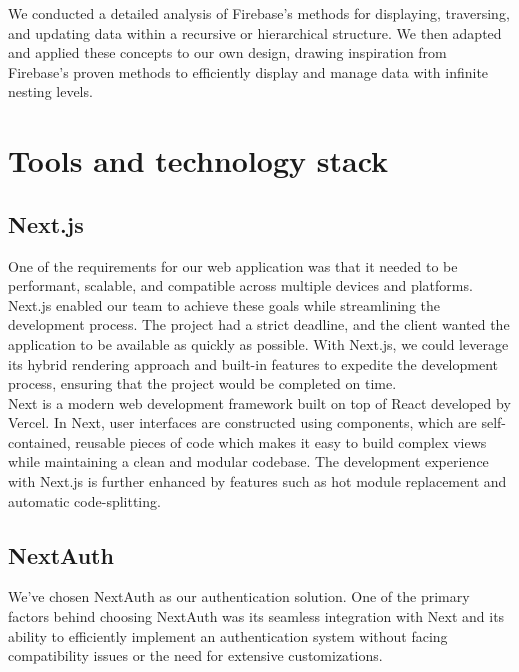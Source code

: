 \noindent 
We conducted a detailed analysis of Firebase’s methods for displaying, traversing, and updating data within a recursive or hierarchical structure. We then adapted and applied these concepts to our own design, drawing inspiration from Firebase's proven methods to efficiently display and manage data with infinite nesting levels. 



\section{Tools and technology stack}

\subsection{Next.js}

One of the requirements for our web application was that it needed to be performant, scalable, and compatible across multiple devices and platforms. Next.js enabled our team to achieve these goals while streamlining the development process. The project had a strict deadline, and the client wanted the application to be available as quickly as possible. With Next.js, we could leverage its hybrid rendering approach and built-in features to expedite the development process, ensuring that the project would be completed on time. \\

\noindent
Next is a modern web development framework built on top of React developed by Vercel. In Next, user interfaces are constructed using components, which are self-contained, reusable pieces of code which makes it easy to build complex views while maintaining a clean and modular codebase. The development experience with Next.js is further enhanced by features such as hot module replacement and automatic code-splitting. \cite{NextjsDocs}

\subsection{NextAuth}

We’ve chosen NextAuth as our authentication solution. One of the primary factors behind choosing NextAuth was its seamless integration with Next and its ability to  efficiently implement an authentication system without facing compatibility issues or the need for extensive customizations. \\

